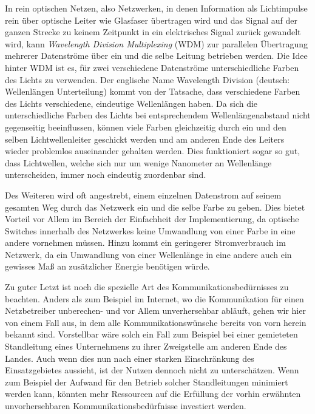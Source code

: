 In rein optischen Netzen, also Netzwerken, in denen Information als Lichtimpulse rein über optische Leiter wie Glasfaser übertragen wird und das Signal auf der ganzen Strecke zu keinem Zeitpunkt in ein elektrisches Signal zurück gewandelt wird, kann \textit{Wavelength Division Multiplexing} (WDM) zur parallelen Übertragung mehrerer Datenströme über ein und die selbe Leitung betrieben werden. Die Idee hinter WDM ist es, für zwei verschiedene Datenströme unterschiedliche Farben des Lichts zu verwenden. Der englische Name Wavelength Division (deutsch: Wellenlängen Unterteilung) kommt von der Tatsache, dass verschiedene Farben des Lichts verschiedene, eindeutige Wellenlängen haben. Da sich die unterschiedliche Farben des Lichts bei entsprechendem Wellenlängenabstand nicht gegenseitig beeinflussen, können viele Farben gleichzeitig durch ein und den selben Lichtwellenleiter geschickt werden und am anderen Ende des Leiters wieder problemlos auseinander gehalten werden. Dies funktioniert sogar so gut, dass Lichtwellen, welche sich nur um wenige Nanometer an Wellenlänge unterscheiden, immer noch eindeutig zuordenbar sind.

Des Weiteren wird oft angestrebt, einem einzelnen Datenstrom auf seinem gesamten Weg durch das Netzwerk ein und die selbe Farbe zu geben. Dies bietet Vorteil vor Allem im Bereich der Einfachheit der Implementierung, da optische Switches innerhalb des Netzwerkes keine Umwandlung von einer Farbe in eine andere vornehmen müssen. Hinzu kommt ein geringerer Stromverbrauch im Netzwerk, da ein Umwandlung von einer Wellenlänge in eine andere auch ein gewisses Maß an zusätzlicher Energie benötigen würde.

Zu guter Letzt ist noch die spezielle Art des Kommunikationsbedürnisses zu beachten. Anders als zum Beispiel im Internet, wo die Kommunikation für einen Netzbetreiber unberechen- und vor Allem unverhersehbar abläuft, gehen wir hier von einem Fall aus, in dem alle Kommunikationswünsche bereits von vorn herein bekannt sind. Vorstellbar wäre solch ein Fall zum Beispiel bei einer gemieteten Standleitung eines Unternehmens zu ihrer Zweigstelle am anderen Ende des Landes. Auch wenn dies nun nach einer starken Einschränkung des Einsatzgebietes aussieht, ist der Nutzen dennoch nicht zu unterschätzen. Wenn zum Beispiel der Aufwand für den Betrieb solcher Standleitungen minimiert werden kann, könnten mehr Ressourcen auf die Erfüllung der vorhin erwähnten unvorhersehbaren Kommunikationsbedürfnisse investiert werden.

